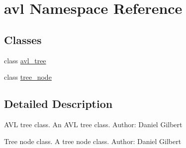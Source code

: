 \hypertarget{namespaceavl}{}\section{avl Namespace Reference}
\label{namespaceavl}
\subsection*{Classes}
\begin{DoxyCompactItemize}
\item 
class \hyperlink{classavl_1_1avl__tree}{avl\+\_\+tree}
\item 
class \hyperlink{classavl_1_1tree__node}{tree\+\_\+node}
\end{DoxyCompactItemize}


\subsection{Detailed Description}
A\+VL tree class. An A\+VL tree class. Author\+: Daniel Gilbert

Tree node class. A tree node class. Author\+: Daniel Gilbert 